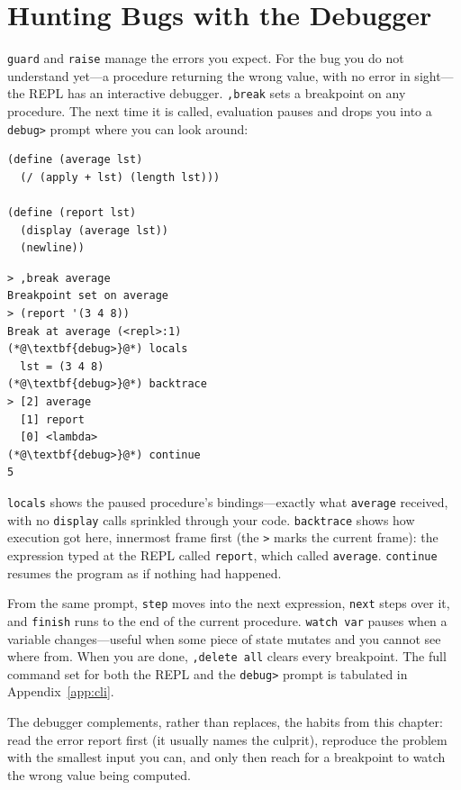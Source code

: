 \section{Hunting Bugs with the Debugger}

\texttt{guard} and \texttt{raise} manage the errors you expect. For the bug you do not understand yet---a procedure returning the wrong value, with no error in sight---the REPL has an interactive debugger. \texttt{,break} sets a breakpoint on any procedure. The next time it is called, evaluation pauses and drops you into a \texttt{debug>} prompt where you can look around:

\begin{lstlisting}
(define (average lst)
  (/ (apply + lst) (length lst)))

(define (report lst)
  (display (average lst))
  (newline))
\end{lstlisting}

\begin{lstlisting}[style=repl]
> ,break average
Breakpoint set on average
> (report '(3 4 8))
Break at average (<repl>:1)
(*@\textbf{debug>}@*) locals
  lst = (3 4 8)
(*@\textbf{debug>}@*) backtrace
> [2] average
  [1] report
  [0] <lambda>
(*@\textbf{debug>}@*) continue
5
\end{lstlisting}

\texttt{locals} shows the paused procedure's bindings---exactly what \texttt{average} received, with no \texttt{display} calls sprinkled through your code. \texttt{backtrace} shows how execution got here, innermost frame first (the \texttt{>} marks the current frame): the expression typed at the REPL called \texttt{report}, which called \texttt{average}. \texttt{continue} resumes the program as if nothing had happened.

From the same prompt, \texttt{step} moves into the next expression, \texttt{next} steps over it, and \texttt{finish} runs to the end of the current procedure. \texttt{watch var} pauses when a variable changes---useful when some piece of state mutates and you cannot see where from. When you are done, \texttt{,delete all} clears every breakpoint. The full command set for both the REPL and the \texttt{debug>} prompt is tabulated in Appendix~\ref{app:cli}.

The debugger complements, rather than replaces, the habits from this chapter: read the error report first (it usually names the culprit), reproduce the problem with the smallest input you can, and only then reach for a breakpoint to watch the wrong value being computed.


